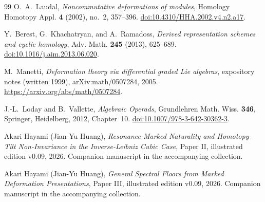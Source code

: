 \documentclass[11pt]{amsart}
\begin{document}
\begin{thebibliography}{99}
O.~A.~Laudal,
\emph{Noncommutative deformations of modules},
Homology Homotopy Appl. \textbf{4} (2002), no.~2, 357--396.
\href{https://doi.org/10.4310/HHA.2002.v4.n2.a17}{doi:10.4310/HHA.2002.v4.n2.a17}.

Y.~Berest, G.~Khachatryan, and A.~Ramadoss,
\emph{Derived representation schemes and cyclic homology},
Adv. Math. \textbf{245} (2013), 625--689.
\href{https://doi.org/10.1016/j.aim.2013.06.020}{doi:10.1016/j.aim.2013.06.020}.


M.~Manetti,
\emph{Deformation theory via differential graded Lie algebras},
expository notes (written 1999), arXiv:math/0507284, 2005.
\url{https://arxiv.org/abs/math/0507284}.

J.-L.~Loday and B.~Vallette,
\emph{Algebraic Operads}, Grundlehren Math. Wiss. \textbf{346},
Springer, Heidelberg, 2012, Chapter~10.
\href{https://doi.org/10.1007/978-3-642-30362-3}{doi:10.1007/978-3-642-30362-3}.

Akari Hayami (Jian-Yu Huang),
\emph{Resonance-Marked Naturality and Homotopy-Tilt Non-Invariance in the Inverse-Leibniz Cubic Case},
Paper II, illustrated edition v0.09, 2026. Companion manuscript in the accompanying collection.

Akari Hayami (Jian-Yu Huang),
\emph{General Spectral Floors from Marked Deformation Presentations},
Paper III, illustrated edition v0.09, 2026. Companion manuscript in the accompanying collection.
\end{thebibliography}
\end{document}
